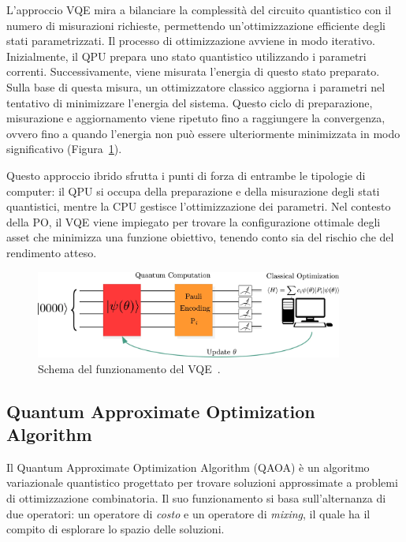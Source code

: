 L'approccio VQE mira a bilanciare la complessità del circuito quantistico con il 
numero di misurazioni richieste, permettendo un'ottimizzazione efficiente degli 
stati parametrizzati. Il processo di ottimizzazione avviene in modo iterativo. 
Inizialmente, il QPU prepara uno stato quantistico utilizzando 
i parametri correnti. Successivamente, viene misurata l'energia di questo stato 
preparato. Sulla base di questa misura, un ottimizzatore classico aggiorna i 
parametri nel tentativo di minimizzare l'energia del sistema. Questo ciclo di 
preparazione, misurazione e aggiornamento viene ripetuto fino a raggiungere la 
convergenza, ovvero fino a quando l'energia non può essere ulteriormente 
minimizzata in modo significativo (Figura~\ref{fig:circuitoVQE}).

Questo approccio ibrido sfrutta i punti di forza di entrambe le tipologie di 
computer: il QPU si occupa della preparazione e della misurazione 
degli stati quantistici, mentre la CPU gestisce l'ottimizzazione 
dei parametri. Nel contesto della PO, il VQE viene 
impiegato per trovare la configurazione ottimale degli asset che minimizza una 
funzione obiettivo, tenendo conto sia del rischio che del rendimento atteso.

\begin{figure}[h!]
    \centering
    \includegraphics[width=0.9\textwidth]{images/vqe.png}
    \caption{Schema del funzionamento del VQE~\cite{buonaiuto2023best}.}
    \label{fig:circuitoVQE}
\end{figure}




\subsection{Quantum Approximate Optimization Algorithm}\label{sec:qaoa}
Il Quantum Approximate Optimization Algorithm (QAOA) è un algoritmo variazionale 
quantistico progettato per trovare soluzioni approssimate a problemi di 
ottimizzazione combinatoria. Il suo funzionamento si basa sull'alternanza di 
due operatori: un operatore di \textit{costo} e un operatore di \textit{mixing}, 
il quale ha il compito di esplorare lo spazio delle soluzioni.

